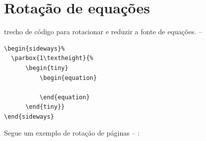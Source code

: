 \section{Rotação de equações}

trecho de código para rotacionar e reduzir a fonte de equações. -- \showfont

\begin{verbatim}
\begin{sideways}%
  \parbox{1\textheight}{%
      \begin{tiny}
          \begin{equation}

          \end{equation}
      \end{tiny}}
\end{sideways}
\end{verbatim}


Segue um exemplo de rotação de páginas -- \showfont: \newpage

